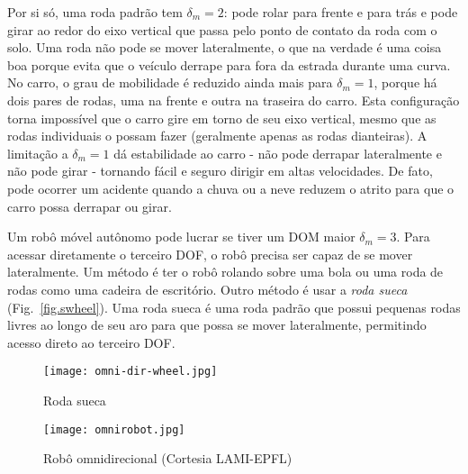 {Por si só, uma roda padrão tem $\delta_m=2$: pode rolar para frente e para trás e pode girar ao redor do eixo vertical que passa pelo ponto de contato da roda com o solo. Uma roda não pode se mover lateralmente, o que na verdade é uma coisa boa porque evita que o veículo derrape para fora da estrada durante uma curva. No carro, o grau de mobilidade é reduzido ainda mais para $\delta_m=1$, porque há dois pares de rodas, uma na frente e outra na traseira do carro. Esta configuração torna impossível que o carro gire em torno de seu eixo vertical, mesmo que as rodas individuais o possam fazer (geralmente apenas as rodas dianteiras). A limitação a $\delta_m=1$ dá estabilidade ao carro - não pode derrapar lateralmente e não pode girar - tornando fácil e seguro dirigir em altas velocidades. De fato, pode ocorrer um acidente quando a chuva ou a neve reduzem o atrito para que o carro possa derrapar ou girar.

Um robô móvel autônomo pode lucrar se tiver um DOM maior $\delta_m = 3$. Para acessar diretamente o terceiro DOF, o robô precisa ser capaz de se mover lateralmente. Um método é ter o robô rolando sobre uma bola ou uma roda de rodas como uma cadeira de escritório. Outro método é usar a \emph{roda sueca} (Fig.~\ref{fig.swheel}). Uma roda sueca é uma roda padrão que possui pequenas rodas livres ao longo de seu aro para que possa se mover lateralmente, permitindo acesso direto ao terceiro DOF.

\begin{figure}
\begin{minipage}{.45\textwidth}
\texttt{[image: omni-dir-wheel.jpg]}
\caption{Roda sueca}\label{fig.swheel}
\end{minipage}
\hspace{\fill}
\begin{minipage}{.45\textwidth}\texttt{[image: omnirobot.jpg]}
\caption{Robô omnidirecional (Cortesia LAMI-EPFL)}\label{fig.omni-robot}
\end{minipage}
\end{figure}



}
